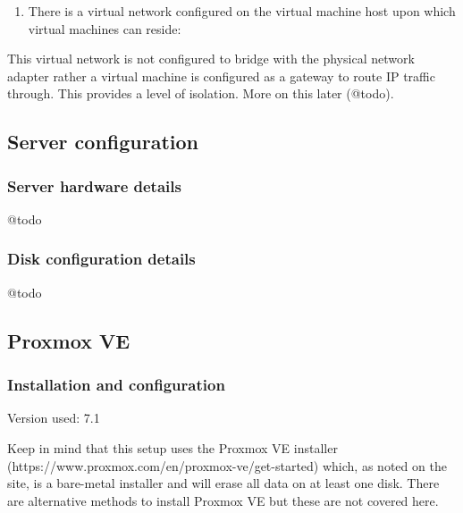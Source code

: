 \begin{enumerate}
\def\labelenumi{\arabic{enumi}.}
\setcounter{enumi}{1}

\item
  There is a virtual network configured on the virtual machine host upon
  which virtual machines can reside:
\end{enumerate}

This virtual network is not configured to bridge with the physical
network adapter rather a virtual machine is configured as a gateway to
route IP traffic through. This provides a level of isolation. More on
this later (@todo).

\hypertarget{server-configuration}{%
\subsection{Server configuration}\label{server-configuration}}

\hypertarget{server-hardware-details}{%
\subsubsection{Server hardware details}\label{server-hardware-details}}

@todo

\hypertarget{disk-configuration-details}{%
\subsubsection{Disk configuration
details}\label{disk-configuration-details}}

@todo

\hypertarget{proxmox-ve}{%
\subsection{Proxmox VE}\label{proxmox-ve}}

\hypertarget{installation-and-configuration}{%
\subsubsection{Installation and
configuration}\label{installation-and-configuration}}

Version used: 7.1

Keep in mind that this setup uses the Proxmox VE installer
(https://www.proxmox.com/en/proxmox-ve/get-started) which, as noted on
the site, is a bare-metal installer and will erase all data on at least
one disk. There are alternative methods to install Proxmox VE but these
are not covered here.


